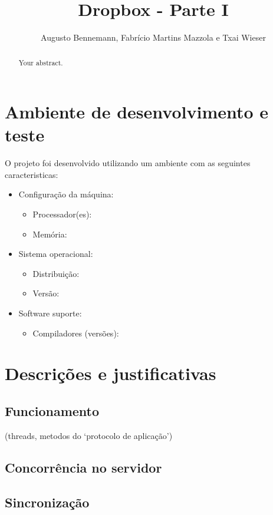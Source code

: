\documentclass[a4paper]{article}
\title{Dropbox - Parte I}
\author{Augusto Bennemann, Fabrício Martins Mazzola e Txai Wieser}
\begin{document}
\maketitle

\begin{abstract}
Your abstract.
\end{abstract}

\section{Ambiente de desenvolvimento e teste}

O projeto foi desenvolvido utilizando um ambiente com as seguintes caracteristicas:
\begin{itemize}
	\item Configuração da máquina:
	\begin{itemize}
		\item Processador(es):
		\item Memória:
	\end{itemize}

	\item{Sistema operacional}: 
	\begin{itemize}
		\item Distribuição:
		\item Versão:
	\end{itemize}

	\item Software suporte:
	\begin{itemize}
		\item Compiladores (versões):
	\end{itemize}
\end{itemize}

\section{Descrições e justificativas}

\subsection{Funcionamento}
(threads, metodos do ‘protocolo de aplicação’)

\subsection{Concorrência no servidor}

\subsection{Sincronização}
\end{document}
